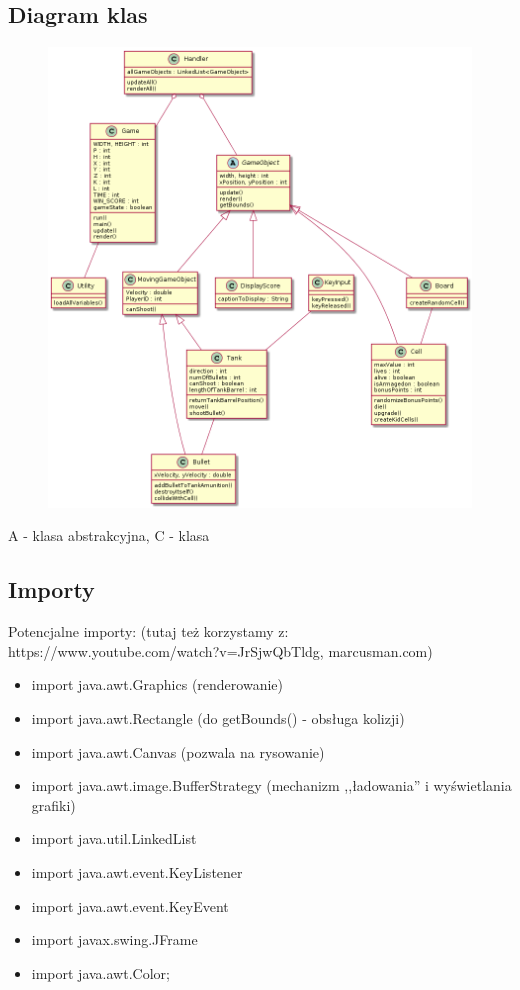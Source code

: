\documentclass{article}
\begin{document}
\subsection{Diagram klas}

\begin{figure} [hbt!]
   \includegraphics[width=14cm, center]{img/diagramKLAS_1.png}
\end{figure}

A - klasa abstrakcyjna, C - klasa
\clearpage

\subsection{Importy}

Potencjalne importy: (tutaj też korzystamy z: \\ 
https://www.youtube.com/watch?v=JrSjwQbTldg, marcusman.com)
\begin{itemize}
    \item import java.awt.Graphics (renderowanie)
    \item import java.awt.Rectangle (do getBounds() - obsługa kolizji)
    \item import java.awt.Canvas (pozwala na rysowanie)
    \item import java.awt.image.BufferStrategy (mechanizm ,,ładowania'' i wyświetlania grafiki)
    \item import java.util.LinkedList
    \item import java.awt.event.KeyListener
    \item import java.awt.event.KeyEvent
    \item import javax.swing.JFrame
    \item import java.awt.Color;
\end{itemize}
\end{document}
